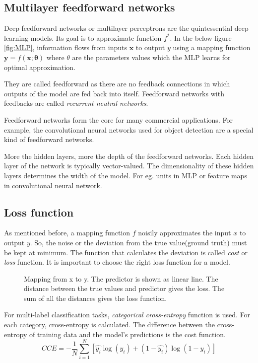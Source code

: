 \subsection{Multilayer feedforward networks}
\label{subsec:MLP}
Deep feedforward networks or multilayer perceptrons are the quintessential deep learning
models. Its goal is to approximate function $f^*$. In the below figure \ref{fig:MLP},
information flows from inputs $\mathbf{x}$ to output $y$ using a mapping function
$\mathbf{y} = f(\mathbf{x};\mathbf{\theta})$ where $\theta$ are the parameters values
which the MLP learns for optimal approximation.

They are called feedforward as there are no feedback connections in which outputs of the
model are fed back into itself. Feedforward networks with feedbacks are called
\textit{recurrent neutral networks}.

Feedforward networks form the core for many commercial applications. For example, the
convolutional neural networks used for object detection are a special kind of feedforward
networks.

More the hidden layers, more the depth of the feedforward networks. Each hidden layer of the network is typically vector-valued.
The dimensionality of these hidden layers determines the width of the model. For eg. units
in MLP or feature maps in convolutional neural network.

\subsection{Loss function}
\label{subsec:lossfunction}
As mentioned before, a mapping function $f$ noisily approximates the input $x$ to output
$y$. So, the noise or the deviation from the true value(ground truth) must be kept at
minimum. The function that calculates the deviation is called \textit{cost} or
\textit{loss} function. It is important to choose the right loss function for a model.

\begin{figure}[!ht]
	\centering
    \def\svgwidth{0.6\textwidth}
    \caption{Mapping from x to y. The predictor is shown as linear line. The distance
    between the true values and predictor gives the loss. The sum of all the distances
gives the loss function.}
\label{fig:loss function}
\end{figure}

For multi-label classification tasks, \textit{categorical cross-entropy} function is used.
For each category, cross-entropy is calculated. The difference between the cross-entropy
of training data and the model's predictions is the cost function.
\begin{equation}
  CCE = -\frac{1}{N}\sum_{i = 1}^N [\hat{y_{i}}\log(y_{i})  + (1-
  \hat{y_{i}})\log(1-y_{i})]
   \label{eq:CCE}
\end{equation}

